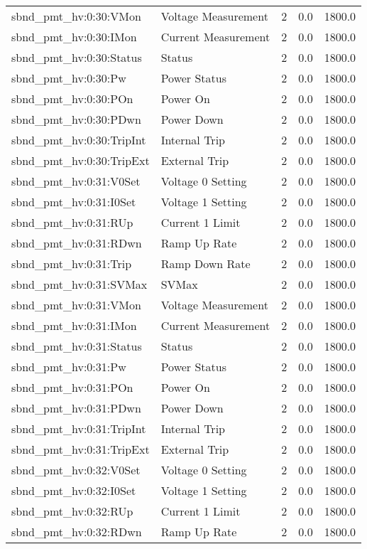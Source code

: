 \begin{center}
\begin{longtable}{l | l l l l }
sbnd\_pmt\_hv:0:30:VMon & Voltage Measurement & 2 & 0.0 & 1800.0\\ 
sbnd\_pmt\_hv:0:30:IMon & Current Measurement & 2 & 0.0 & 1800.0\\ 
sbnd\_pmt\_hv:0:30:Status & Status & 2 & 0.0 & 1800.0\\ 
sbnd\_pmt\_hv:0:30:Pw & Power Status & 2 & 0.0 & 1800.0\\ 
sbnd\_pmt\_hv:0:30:POn & Power On & 2 & 0.0 & 1800.0\\ 
sbnd\_pmt\_hv:0:30:PDwn & Power Down & 2 & 0.0 & 1800.0\\ 
sbnd\_pmt\_hv:0:30:TripInt & Internal Trip & 2 & 0.0 & 1800.0\\ 
sbnd\_pmt\_hv:0:30:TripExt & External Trip & 2 & 0.0 & 1800.0\\ 
sbnd\_pmt\_hv:0:31:V0Set & Voltage 0 Setting & 2 & 0.0 & 1800.0\\ 
sbnd\_pmt\_hv:0:31:I0Set & Voltage 1 Setting & 2 & 0.0 & 1800.0\\ 
sbnd\_pmt\_hv:0:31:RUp & Current 1 Limit & 2 & 0.0 & 1800.0\\ 
sbnd\_pmt\_hv:0:31:RDwn & Ramp Up Rate & 2 & 0.0 & 1800.0\\ 
sbnd\_pmt\_hv:0:31:Trip & Ramp Down Rate & 2 & 0.0 & 1800.0\\ 
sbnd\_pmt\_hv:0:31:SVMax & SVMax & 2 & 0.0 & 1800.0\\ 
sbnd\_pmt\_hv:0:31:VMon & Voltage Measurement & 2 & 0.0 & 1800.0\\ 
sbnd\_pmt\_hv:0:31:IMon & Current Measurement & 2 & 0.0 & 1800.0\\ 
sbnd\_pmt\_hv:0:31:Status & Status & 2 & 0.0 & 1800.0\\ 
sbnd\_pmt\_hv:0:31:Pw & Power Status & 2 & 0.0 & 1800.0\\ 
sbnd\_pmt\_hv:0:31:POn & Power On & 2 & 0.0 & 1800.0\\ 
sbnd\_pmt\_hv:0:31:PDwn & Power Down & 2 & 0.0 & 1800.0\\ 
sbnd\_pmt\_hv:0:31:TripInt & Internal Trip & 2 & 0.0 & 1800.0\\ 
sbnd\_pmt\_hv:0:31:TripExt & External Trip & 2 & 0.0 & 1800.0\\ 
sbnd\_pmt\_hv:0:32:V0Set & Voltage 0 Setting & 2 & 0.0 & 1800.0\\ 
sbnd\_pmt\_hv:0:32:I0Set & Voltage 1 Setting & 2 & 0.0 & 1800.0\\ 
sbnd\_pmt\_hv:0:32:RUp & Current 1 Limit & 2 & 0.0 & 1800.0\\ 
sbnd\_pmt\_hv:0:32:RDwn & Ramp Up Rate & 2 & 0.0 & 1800.0\\ 

\end{longtable}
\end{center}
